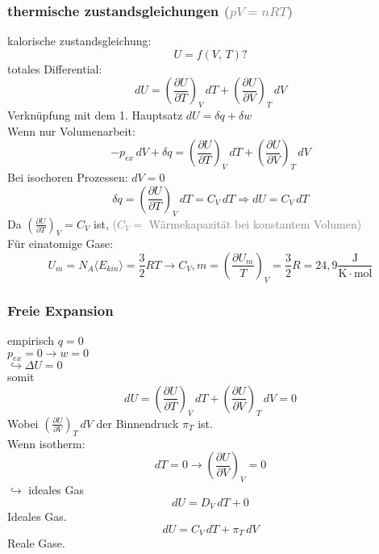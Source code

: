 \documentclass[a4paper]{article}
\begin{document}
\subsubsection{thermische zustandsgleichungen \textcolor{gray}{($pV=nRT$)}}
kalorische zustandsgleichung:
\begin{equation*}
    U = f(V,\,T) ?
\end{equation*}
totales Differential:
\begin{equation*}
    dU = \left(\frac{\partial U}{\partial T}\right)_V\,dT+\left(\frac{\partial U}{\partial V}\right)_T\,dV
\end{equation*}
Verknüpfung mit dem 1. Hauptsatz $dU = \delta q + \delta w$\\
Wenn nur Volumenarbeit:
\begin{equation*}
    -p_{ex}\,dV + \delta q = \left(\frac{\partial U}{\partial T}\right)_V\,dT+\left(\frac{\partial U}{\partial V}\right)_T\,dV
\end{equation*}
Bei isochoren Prozessen: $dV = 0$
\begin{equation*}
    \delta q = \left(\frac{\partial U}{\partial T}\right)_V \,dT = C_V \,dT \Rightarrow dU = C_V \,dT
\end{equation*}
Da $\left(\frac{\partial U}{\partial T}\right)_V = C_V$ ist, \textcolor{gray}{($C_V =$ Wärmekapazität bei konstantem Volumen)}\\
Für einatomige Gase:
\begin{equation*}
    U_m = N_A\langle E_{kin}\rangle = \frac{3}{2}RT \rightarrow C_V,m = \left(\frac{\partial U_m}{T}\right)_V = \frac{3}{2}R = 24,9 \mathrm{\frac{J}{K \cdot mol}}
\end{equation*}

\subsubsection{Freie Expansion}
empirisch $q = 0$\\
$p_{ex}=0 \rightarrow w=0$\\
$\hookrightarrow \Delta U =0$\\
somit
\begin{equation*}
    dU = \left(\frac{\partial U}{\partial T}\right)_V\,dT+\left(\frac{\partial U}{\partial V}\right)_T\,dV = 0
\end{equation*}
Wobei $\left(\frac{\partial U}{\partial V}\right)_T\,dV$ der Binnendruck $\pi_T$ ist.\\
Wenn isotherm:
\begin{equation*}
    dT = 0 \rightarrow \left(\frac{\partial U}{\partial V}\right)_V = 0
\end{equation*}
$\hookrightarrow$ ideales Gas
\begin{equation*}
    dU = D_V\, dT + 0
\end{equation*}
Ideales Gas.\\
\begin{equation*}
    dU = C_V\, dT + \pi_T \,dV
\end{equation*}
Reale Gase.\\
\end{document}
